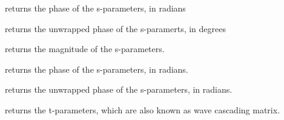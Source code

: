 \documentclass[letterpaper,10pt,english]{sphinxmanual}
\begin{document}
\begin{fulllineitems}
\begin{fulllineitems}
\begin{description}
\begin{description}
\end{description}

\end{description}

\end{fulllineitems}


\begin{fulllineitems}
\label{auto_network:mwavepy.Network.s_deg}
returns the phase of the s-parameters, in radians

\end{fulllineitems}


\begin{fulllineitems}
\label{auto_network:mwavepy.Network.s_deg_unwrap}
returns the unwrapped phase of the s-paramerts, in degrees

\end{fulllineitems}


\begin{fulllineitems}
\label{auto_network:mwavepy.Network.s_mag}
returns the magnitude of the s-parameters.

\end{fulllineitems}


\begin{fulllineitems}
\label{auto_network:mwavepy.Network.s_rad}
returns the phase of the s-parameters, in radians.

\end{fulllineitems}


\begin{fulllineitems}
\label{auto_network:mwavepy.Network.s_rad_unwrap}
returns the unwrapped phase of the s-parameters, in radians.

\end{fulllineitems}


\begin{fulllineitems}
\label{auto_network:mwavepy.Network.t}
returns the t-parameters, which are also known as wave cascading
matrix.


\end{fulllineitems}
\end{fulllineitems}
\end{document}
